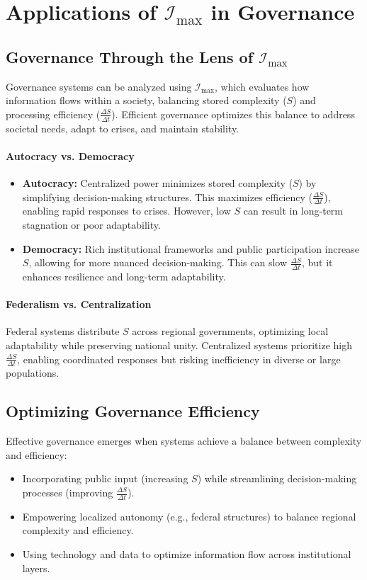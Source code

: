 \documentclass[12pt]{article}
\begin{document}
\section{Applications of \(\mathcal{I}_{\text{max}}\) in Governance}

\subsection{Governance Through the Lens of \(\mathcal{I}_{\text{max}}\)}
Governance systems can be analyzed using \(\mathcal{I}_{\text{max}}\), which evaluates how information flows within a society, balancing stored complexity (\(S\)) and processing efficiency (\(\frac{\Delta S}{\Delta t}\)). Efficient governance optimizes this balance to address societal needs, adapt to crises, and maintain stability.

\paragraph{Autocracy vs. Democracy}
\begin{itemize}
    \item \textbf{Autocracy:} Centralized power minimizes stored complexity (\(S\)) by simplifying decision-making structures. This maximizes efficiency (\(\frac{\Delta S}{\Delta t}\)), enabling rapid responses to crises. However, low \(S\) can result in long-term stagnation or poor adaptability.
    \item \textbf{Democracy:} Rich institutional frameworks and public participation increase \(S\), allowing for more nuanced decision-making. This can slow \(\frac{\Delta S}{\Delta t}\), but it enhances resilience and long-term adaptability.
\end{itemize}

\paragraph{Federalism vs. Centralization}
Federal systems distribute \(S\) across regional governments, optimizing local adaptability while preserving national unity. Centralized systems prioritize high \(\frac{\Delta S}{\Delta t}\), enabling coordinated responses but risking inefficiency in diverse or large populations.

\subsection{Optimizing Governance Efficiency}
Effective governance emerges when systems achieve a balance between complexity and efficiency:
\begin{itemize}
    \item Incorporating public input (increasing \(S\)) while streamlining decision-making processes (improving \(\frac{\Delta S}{\Delta t}\)).
    \item Empowering localized autonomy (e.g., federal structures) to balance regional complexity and efficiency.
    \item Using technology and data to optimize information flow across institutional layers.
\end{itemize}
\end{document}
